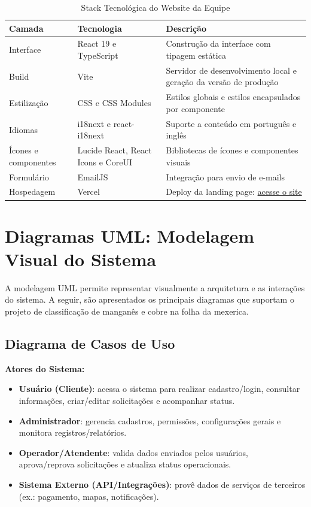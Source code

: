 \documentclass[11pt,a4paper]{article}
\begin{document}
\begin{table}[H]
\centering
\caption{Stack Tecnológica do Website da Equipe}
\label{tab:stack-web}
\begin{tabular}{|p{2.8cm}|p{4.8cm}|p{7cm}|}
\hline
\textbf{Camada} & \textbf{Tecnologia} & \textbf{Descrição} \\
\hline
Interface & React 19 e TypeScript & Construção da interface com tipagem estática \\
Build & Vite & Servidor de desenvolvimento local e geração da versão de produção \\
Estilização & CSS e CSS Modules & Estilos globais e estilos encapsulados por componente \\
Idiomas & i18next e react-i18next & Suporte a conteúdo em português e inglês \\
Ícones e componentes & Lucide React, React Icons e CoreUI & Bibliotecas de ícones e componentes visuais \\
Formulário & EmailJS & Integração para envio de e-mails \\
Hospedagem & Vercel & Deploy da landing page: \href{https://vitalliz-group.vercel.app/}{acesse o site} \\
\hline
\end{tabular}
\end{table}

\section{Diagramas UML: Modelagem Visual do Sistema}

A modelagem UML permite representar visualmente a arquitetura e as interações do sistema.
A seguir, são apresentados os principais diagramas que suportam o projeto de classificação de manganês e cobre na folha da mexerica.

\subsection{Diagrama de Casos de Uso}

\noindent\textbf{Atores do Sistema:}
\begin{itemize}[itemsep=0.6em, topsep=0.3em, parsep=0pt]
    \item \textbf{Usuário (Cliente)}: acessa o sistema para realizar cadastro/login, consultar informações, criar/editar solicitações e acompanhar status.
    \item \textbf{Administrador}: gerencia cadastros, permissões, configurações gerais e monitora registros/relatórios.
    \item \textbf{Operador/Atendente}: valida dados enviados pelos usuários, aprova/reprova solicitações e atualiza status operacionais.
    \item \textbf{Sistema Externo (API/Integrações)}: provê dados de serviços de terceiros (ex.: pagamento, mapas, notificações).
\end{itemize}
\end{document}

